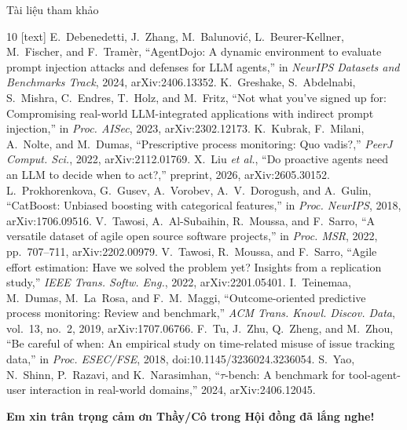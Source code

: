 \begin{frame}{Tài liệu tham khảo}
  \tiny
  \begin{thebibliography}{10}
    [text]
    \setlength{\itemsep}{1.5pt}
     E.~Debenedetti, J.~Zhang, M.~Balunovi\'{c}, L.~Beurer-Kellner, M.~Fischer, and F.~Tram\`{e}r, ``AgentDojo: A dynamic environment to evaluate prompt injection attacks and defenses for LLM agents,'' in \emph{NeurIPS Datasets and Benchmarks Track}, 2024, arXiv:2406.13352.
     K.~Greshake, S.~Abdelnabi, S.~Mishra, C.~Endres, T.~Holz, and M.~Fritz, ``Not what you've signed up for: Compromising real-world LLM-integrated applications with indirect prompt injection,'' in \emph{Proc. AISec}, 2023, arXiv:2302.12173.
     K.~Kubrak, F.~Milani, A.~Nolte, and M.~Dumas, ``Prescriptive process monitoring: Quo vadis?,'' \emph{PeerJ Comput. Sci.}, 2022, arXiv:2112.01769.
     X.~Liu \emph{et al.}, ``Do proactive agents need an LLM to decide when to act?,'' preprint, 2026, arXiv:2605.30152.
     L.~Prokhorenkova, G.~Gusev, A.~Vorobev, A.~V.~Dorogush, and A.~Gulin, ``CatBoost: Unbiased boosting with categorical features,'' in \emph{Proc. NeurIPS}, 2018, arXiv:1706.09516.
     V.~Tawosi, A.~Al-Subaihin, R.~Moussa, and F.~Sarro, ``A versatile dataset of agile open source software projects,'' in \emph{Proc. MSR}, 2022, pp.~707--711, arXiv:2202.00979.
     V.~Tawosi, R.~Moussa, and F.~Sarro, ``Agile effort estimation: Have we solved the problem yet? Insights from a replication study,'' \emph{IEEE Trans. Softw. Eng.}, 2022, arXiv:2201.05401.
     I.~Teinemaa, M.~Dumas, M.~La~Rosa, and F.~M.~Maggi, ``Outcome-oriented predictive process monitoring: Review and benchmark,'' \emph{ACM Trans. Knowl. Discov. Data}, vol.~13, no.~2, 2019, arXiv:1707.06766.
     F.~Tu, J.~Zhu, Q.~Zheng, and M.~Zhou, ``Be careful of when: An empirical study on time-related misuse of issue tracking data,'' in \emph{Proc. ESEC/FSE}, 2018, doi:10.1145/3236024.3236054.
     S.~Yao, N.~Shinn, P.~Razavi, and K.~Narasimhan, ``$\tau$-bench: A benchmark for tool-agent-user interaction in real-world domains,'' 2024, arXiv:2406.12045.
  \end{thebibliography}
  \vspace{0.18cm}
  \centering
  {\footnotesize\color{templateDarkRed}\textbf{Em xin trân trọng cảm ơn Thầy/Cô trong Hội đồng đã lắng nghe!}}
\end{frame}
